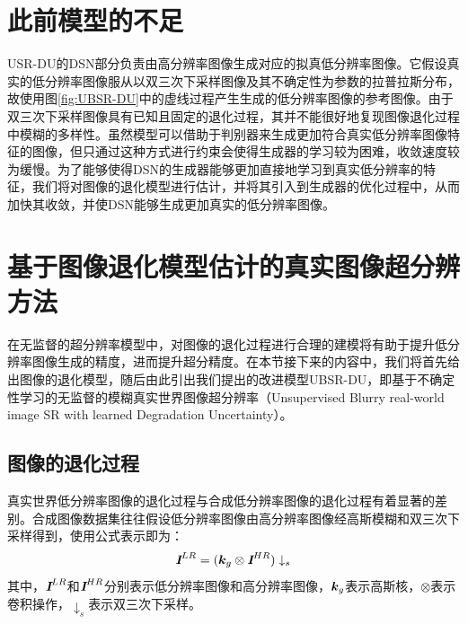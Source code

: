 \section{此前模型的不足}

USR-DU的DSN部分负责由高分辨率图像生成对应的拟真低分辨率图像。它假设真实的低分辨率图像服从以双三次下采样图像及其不确定性为参数的拉普拉斯分布，故使用图\ref{fig:UBSR-DU}中的虚线过程产生生成的低分辨率图像的参考图像。由于双三次下采样图像具有已知且固定的退化过程，其并不能很好地复现图像退化过程中模糊的多样性。虽然模型可以借助于判别器来生成更加符合真实低分辨率图像特征的图像，但只通过这种方式进行约束会使得生成器的学习较为困难，收敛速度较为缓慢。为了能够使得DSN的生成器能够更加直接地学习到真实低分辨率的特征，我们将对图像的退化模型进行估计，并将其引入到生成器的优化过程中，从而加快其收敛，并使DSN能够生成更加真实的低分辨率图像。
\section{基于图像退化模型估计的真实图像超分辨方法}
在无监督的超分辨率模型中，对图像的退化过程进行合理的建模将有助于提升低分辨率图像生成的精度，进而提升超分精度。在本节接下来的内容中，我们将首先给出图像的退化模型，随后由此引出我们提出的改进模型UBSR-DU，即基于不确定性学习的无监督的模糊真实世界图像超分辨率（Unsupervised Blurry real-world image SR with learned Degradation Uncertainty）。
\subsection{图像的退化过程}
真实世界低分辨率图像的退化过程与合成低分辨率图像的退化过程有着显著的差别。合成图像数据集往往假设低分辨率图像由高分辨率图像经高斯模糊和双三次下采样得到，使用公式表示即为：
\begin{equation}
    \textbf{\em I}^{LR}=(\vb*{k}_g\otimes \textbf{\em I}^{HR})\downarrow_s
\end{equation}
其中，$\textbf{\em I}^{LR}$和$\textbf{\em I}^{HR}$分别表示低分辨率图像和高分辨率图像，$\vb*{k}_g$表示高斯核，$\otimes$表示卷积操作，$\downarrow_s$表示双三次下采样。


